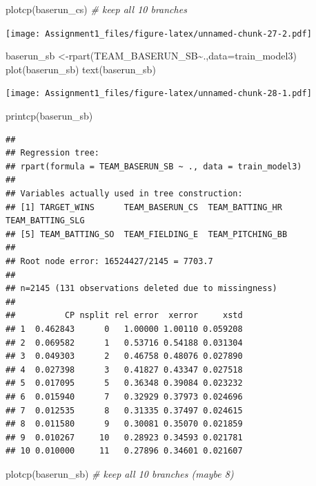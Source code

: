 \documentclass[
]{article}
\newenvironment{Shaded}{\begin{snugshade}}{\end{snugshade}}
\newcommand{\AttributeTok}[1]{\textcolor[rgb]{0.77,0.63,0.00}{#1}}
\newcommand{\CommentTok}[1]{\textcolor[rgb]{0.56,0.35,0.01}{\textit{#1}}}
\newcommand{\FunctionTok}[1]{\textcolor[rgb]{0.00,0.00,0.00}{#1}}
\newcommand{\NormalTok}[1]{#1}
\newcommand{\OtherTok}[1]{\textcolor[rgb]{0.56,0.35,0.01}{#1}}
\newcommand{\SpecialCharTok}[1]{\textcolor[rgb]{0.00,0.00,0.00}{#1}}
\begin{document}
\begin{Shaded}
\begin{Highlighting}[]
\FunctionTok{plotcp}\NormalTok{(baserun\_cs) }\CommentTok{\# keep all 10 branches}
\end{Highlighting}
\end{Shaded}

\texttt{[image: Assignment1\_files/figure-latex/unnamed-chunk-27-2.pdf]}

\begin{Shaded}
\begin{Highlighting}[]
\NormalTok{baserun\_sb }\OtherTok{\textless{}{-}}\FunctionTok{rpart}\NormalTok{(TEAM\_BASERUN\_SB}\SpecialCharTok{\textasciitilde{}}\NormalTok{.,}\AttributeTok{data=}\NormalTok{train\_model3)}
\FunctionTok{plot}\NormalTok{(baserun\_sb)}
\FunctionTok{text}\NormalTok{(baserun\_sb)}
\end{Highlighting}
\end{Shaded}

\texttt{[image: Assignment1\_files/figure-latex/unnamed-chunk-28-1.pdf]}

\begin{Shaded}
\begin{Highlighting}[]
\FunctionTok{printcp}\NormalTok{(baserun\_sb)}
\end{Highlighting}
\end{Shaded}

\begin{verbatim}
## 
## Regression tree:
## rpart(formula = TEAM_BASERUN_SB ~ ., data = train_model3)
## 
## Variables actually used in tree construction:
## [1] TARGET_WINS      TEAM_BASERUN_CS  TEAM_BATTING_HR  TEAM_BATTING_SLG
## [5] TEAM_BATTING_SO  TEAM_FIELDING_E  TEAM_PITCHING_BB
## 
## Root node error: 16524427/2145 = 7703.7
## 
## n=2145 (131 observations deleted due to missingness)
## 
##          CP nsplit rel error  xerror     xstd
## 1  0.462843      0   1.00000 1.00110 0.059208
## 2  0.069582      1   0.53716 0.54188 0.031304
## 3  0.049303      2   0.46758 0.48076 0.027890
## 4  0.027398      3   0.41827 0.43347 0.027518
## 5  0.017095      5   0.36348 0.39084 0.023232
## 6  0.015940      7   0.32929 0.37973 0.024696
## 7  0.012535      8   0.31335 0.37497 0.024615
## 8  0.011580      9   0.30081 0.35070 0.021859
## 9  0.010267     10   0.28923 0.34593 0.021781
## 10 0.010000     11   0.27896 0.34601 0.021607
\end{verbatim}

\begin{Shaded}
\begin{Highlighting}[]
\FunctionTok{plotcp}\NormalTok{(baserun\_sb) }\CommentTok{\# keep all 10 branches (maybe 8)}
\end{Highlighting}
\end{Shaded}
\end{document}

